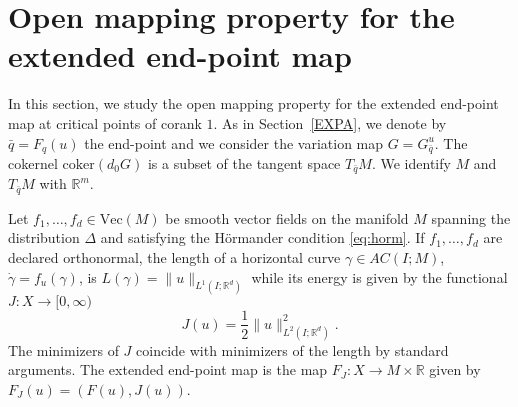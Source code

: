 \documentclass[12pt, reqno]{amsart}
\theoremstyle{plain}
\theoremstyle{definition}
\theoremstyle{remark}
\numberwithin{equation}{section}
\newcommand{\R}{\mathbb{R}}
\newcommand{\0}{\theta}
\newcommand{\1}{{-1}}
\newcommand{\q}{\bar q}
\renewcommand{\=}{\coloneqq}
\renewcommand{\.}{\dots}
\newcommand{\coker}{\mathrm{coker}}
\newcommand{\be}{\begin{equation}}
\newcommand{\ee}{\end{equation}}
\begin{document}
 
 
 
 
 
 
 
 
 
 
 
 
 
 
 
 
 
 
 
 
 
 
 
 
 
 
 
 
 
 
 
 
 
 
 
 
 
 
 
 
 
 
 
 
 
 
 
 
 
 
 
 
 
 
 
 
 
 
 
 
 
 
 
 
 
 
 
 



\section{Open mapping property for the extended end-point map} 
\label{OMP}


In this section, we study the open mapping property for the extended end-point map at critical points of corank $1$. 
As in Section~\ref{EXPA}, we denote by   $\q  = F_q(u)$   the end-point and we consider the variation map $G=G_{\q }^u$.
The cokernel  $\coker(d_0 G)$ is a subset of the tangent space $T_{\q } M$. We identify $M$ and $T_{\q } M$ with $\R^m$. 



	Let $f_1,\dots, f_d \in \mathrm{Vec}(M)$ be smooth vector fields on the manifold $M$ spanning the distribution $\Delta$ and satisfying the H\"ormander condition \eqref{eq:horm}. If $f_1,\dots, f_d$ are declared orthonormal, the length of a horizontal curve $\gamma\in AC( I ;M)$, 	
	$\dot\gamma = f_u(\gamma)$, is   $L(\gamma)=  \| u\|_{L^1(I;\R^d)}$ while its energy is given by the functional  $J:X\to [0,\infty)$
	  \be\label{eq:energy}  J(u) =  \frac12\| u\|^2_{L^2(I;\R^d)}.
	\ee   The minimizers of $J$ coincide with minimizers of the length by standard arguments.
	The extended end-point map is the map $F_J: X\to M\times\R$
	given by $
	 F _J(u) = (F(u), J(u))$. 
	
\end{document}
